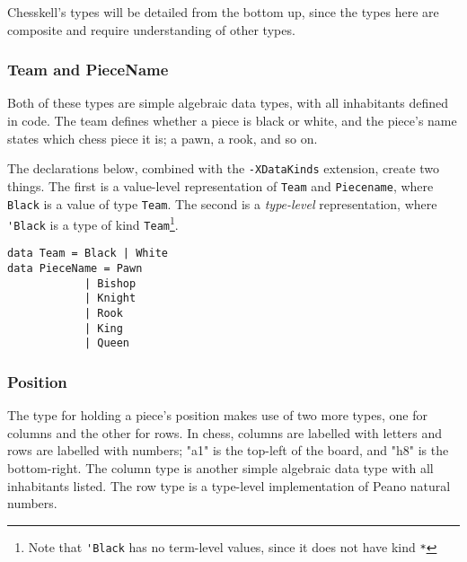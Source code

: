 \documentclass[12pt, a4paper, bibliography=totocnumbered]{scrartcl}
\begin{document}

Chesskell's types will be detailed from the bottom up, since the types here are composite and require understanding of other types.

\subsubsection{Team and PieceName}

Both of these types are simple algebraic data types, with all inhabitants defined in code. The team defines whether a piece is black or white, and the piece's name states which chess piece it is; a pawn, a rook, and so on.

The declarations below, combined with the \lstinline{-XDataKinds} extension, create two things. The first is a value-level representation of \lstinline{Team} and \lstinline{Piecename}, where \lstinline{Black} is a value of type \lstinline{Team}. The second is a \emph{type-level} representation, where \lstinline{'Black} is a type of kind \lstinline{Team}\footnote{Note that \lstinline{'Black} has no term-level values, since it does not have kind \lstinline{*}}.


\begin{lstlisting}
data Team = Black | White
data PieceName = Pawn
            | Bishop
            | Knight
            | Rook
            | King
            | Queen
\end{lstlisting}

\subsubsection{Position}

The type for holding a piece's position makes use of two more types, one for columns and the other for rows. In chess, columns are labelled with letters and rows are labelled with numbers; "a1" is the top-left of the board, and "h8" is the bottom-right. The column type is another simple algebraic data type with all inhabitants listed. The row type is a type-level implementation of Peano natural numbers.
\end{document}
